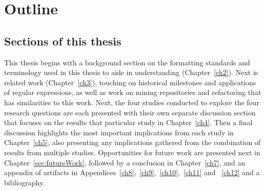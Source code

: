 \section{Outline}

\subsection{Sections of this thesis}
This thesis begins with a background section on the formatting standards and terminology used in this thesis to aide in understanding (Chapter~\ref{ch2}). Next is related work (Chapter~\ref{ch3}), touching on historical milestones and applications of regular expressions, as well as work on mining repositories and refactoring that has similarities to this work. Next, the four studies conducted to explore the four research questions are each presented with their own separate discussion section that focuses on the results that particular study in Chapter~\ref{ch4}.  Then a final discussion highlights the most important implications from each study in Chapter~\ref{ch5}, also presenting any implications gathered from the combination of results from multiple studies. Opportunities for future work are presented next in Chapter~\ref{sec:futureWork}, followed by a conclusion in Chapter~\ref{ch7}, and an appendix of artifacts in Appendices~\ref{ch8},~\ref{ch9},~\ref{ch10},~\ref{ch11} and ~\ref{ch12} and a bibliography.
